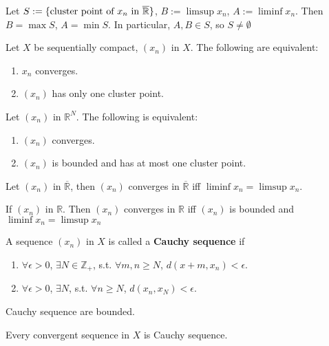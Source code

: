 \begin{theorem}
    Let  $ S:=\{\text{cluster point of  $ x_n $ in  $ \overline{\mathbb{R} } $}\}  $,  $ B:=\limsup x_n  $,  $ A:=\liminf x_n  $. Then  $ B=\max S  $,  $ A=\min S  $. In particular,  $ A,B\in S  $, so  $ S\not=\emptyset  $   
\end{theorem}
\begin{theorem}
    Let  $ X  $ be sequentially compact,  $ (x_n ) $ in  $ X  $. The following are equivalent:
    \begin{enumerate}[(1)]
        \item  $ x_n $ converges. 
        \item  $ (x_n) $ has only one cluster point.
    \end{enumerate}
\end{theorem}
\begin{corollary}
    Let  $ (x_n ) $ in  $ \mathbb{R}^N  $. The following is equivalent:
    \begin{enumerate}[(1)]
        \item  $ (x_n)  $ converges.
        \item  $ (x_n ) $ is bounded and has at most one cluster point.
    \end{enumerate} 
\end{corollary}
\begin{corollary}
    Let  $ (x_n ) $ in  $\overline{\mathbb{R} } $, then  $ (x_n ) $ converges in  $ \overline{\mathbb{R}  } $ iff  $ \liminf x_n=\limsup x_n $. 
\end{corollary}
\begin{corollary}
    If  $ (x_n ) $ in  $ \mathbb{R}   $. Then  $ (x_n ) $ converges in  $ \mathbb{R}  $ iff  $ (x_n ) $ is bounded and  $ \liminf x_n=\limsup x_n $ 
\end{corollary}
\begin{definition}
    A sequence  $ (x_n ) $ in  $ X  $ is called a \textbf{Cauchy sequence} if 
    \begin{enumerate}[$ \cdot $]
        \item  $ \forall \epsilon>0  $,  $ \exists N\in \mathbb{Z}_+  $, s.t.  $ \forall m,n \geq N  $,  $ d(x+m,x_n )<\epsilon  $.
        \item  $ \forall \epsilon>0 $,  $ \exists N  $, s.t.  $ \forall n \geq N  $,  $ d(x_n,x_N)<\epsilon $.  
    \end{enumerate}
\end{definition}
Cauchy sequence are bounded.
\begin{proposition}
    Every convergent sequence in  $ X  $ is Cauchy sequence.
\end{proposition}
